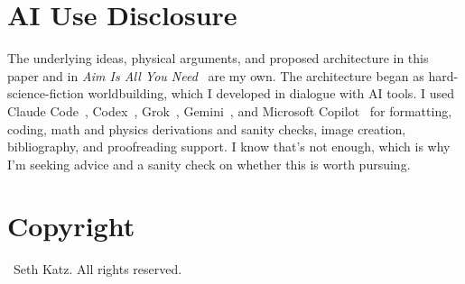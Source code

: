 \documentclass{article}
\begin{document}
\section{AI Use Disclosure}\label{sec:transparency}
The underlying ideas, physical arguments, and proposed architecture in this paper and in \textit{Aim Is All You Need}~\cite{katz2026aim} are my own. The architecture began as hard-science-fiction worldbuilding, which I developed in dialogue with AI tools. I used Claude Code~\cite{claude_code}, Codex~\cite{codex}, Grok~\cite{grok}, Gemini~\cite{gemini}, and Microsoft Copilot~\cite{copilot} for formatting, coding, math and physics derivations and sanity checks, image creation, bibliography, and proofreading support. I know that's not enough, which is why I'm seeking advice and a sanity check on whether this is worth pursuing.

\section{Copyright}\label{sec:copyright}
\small
\textcopyright\ Seth Katz. All rights reserved.

\printbibliography
\end{document}
